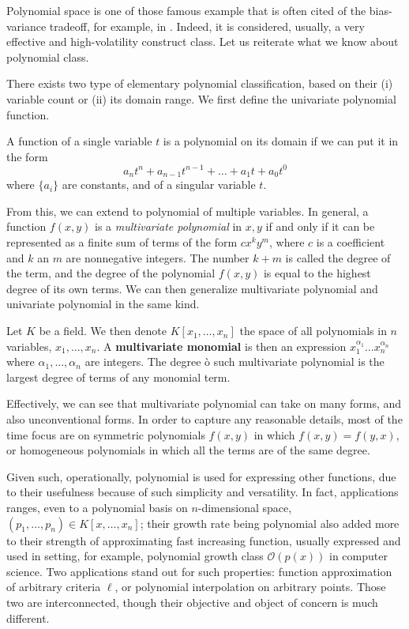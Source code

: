 Polynomial space is one of those famous example that is often cited of the bias-variance tradeoff, for example, in \cite{goodfellow2016deep,10.5555/2930837}. Indeed, it is considered, usually, a very effective and high-volatility construct class. Let us reiterate what we know about polynomial class. 

There exists two type of elementary polynomial classification, based on their (i) variable count or (ii) its domain range. We first define the univariate polynomial function.

\begin{definition}
    A function of a single variable $t$ is a polynomial on its domain if we can put it in the form 
    \begin{equation}
        a_{n}t^{n} + a_{n-1}t^{n-1} + \dots + a_{1}t + a_{0}t^{0}
    \end{equation}
    where $\{a_{i}\}$ are constants, and of a singular variable $t$.  
\end{definition}

From this, we can extend to polynomial of multiple variables. In general, a function $f(x,y)$ is a \textit{multivariate polynomial} in $x,y$ if and only if it can be represented as a finite sum of terms of the form $cx^{k}y^{m}$, where $c$ is a coefficient and $k$ an $m$ are nonnegative integers. The number $k+m$ is called the degree of the term, and the degree of the polynomial $f(x,y)$ is equal to the highest degree of its own terms. We can then generalize multivariate polynomial and univariate polynomial in the same kind. 

\begin{definition}
    Let $K$ be a field. We then denote $K[x_{1},\dots,x_{n}]$ the space of all polynomials in $n$ variables, $x_{1},\dots,x_{n}$. A \textbf{multivariate monomial} is then an expression $x_{1}^{\alpha_{1}}\dots x_{n}^{\alpha_{n}}$ where $\alpha_{1},\dots,\alpha_{n}$ are integers. The degree ò such multivariate polynomial is the largest degree of terms of any monomial term.
\end{definition}
Effectively, we can see that multivariate polynomial can take on many forms, and also unconventional forms. In order to capture any reasonable details, most of the time focus are on symmetric polynomials $f(x,y)$ in which $f(x,y)=f(y,x)$, or homogeneous polynomials in which all the terms are of the same degree. 

Given such, operationally, polynomial is used for expressing other functions, due to their usefulness because of such simplicity and versatility. In fact, applications ranges, even to a polynomial basis on $n$-dimensional space, $(p_{1},\dots,p_{n})\in K[x,\dots,x_{n}]$; their growth rate being polynomial also added more to their strength of approximating fast increasing function, usually expressed and used in setting, for example, polynomial growth class $\mathcal{O}(p(x))$ in computer science. Two applications stand out for such properties: function approximation of arbitrary criteria $\ell$, or polynomial interpolation on arbitrary points. Those two are interconnected, though their objective and object of concern is much different. 

